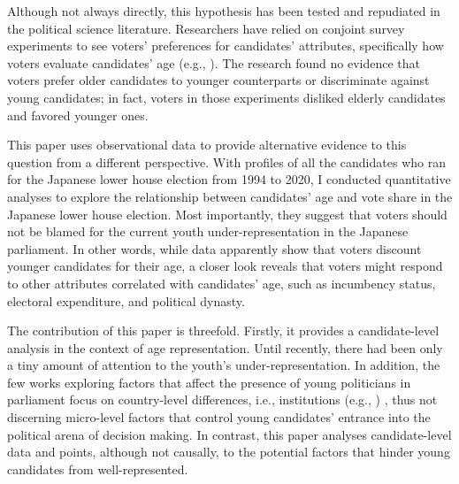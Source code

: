 \documentclass[a4paper, 12pt]{article}\usepackage[dvipdfmx]{graphicx}\usepackage[]{xcolor}
\begin{document}
Although not always directly, this hypothesis has been tested and repudiated in the political science literature. Researchers have relied on conjoint survey experiments to see voters' preferences for candidates' attributes, specifically how voters evaluate candidates' age (e.g., \citet{horiuchi2020identifying, mcclean2022too, eshima2022just}). The research found no evidence that voters prefer older candidates to younger counterparts or discriminate against young candidates; in fact, voters in those experiments disliked elderly candidates and favored younger ones. 

This paper uses observational data to provide alternative evidence to this question from a different perspective. With profiles of all the candidates who ran for the Japanese lower house election from 1994 to 2020, I conducted quantitative analyses to explore the relationship between candidates' age and vote share in the Japanese lower house election. Most importantly, they suggest that voters should not be blamed for the current youth under-representation in the Japanese parliament. In other words, while data apparently show that voters discount younger candidates for their age, a closer look reveals that voters might respond to other attributes correlated with candidates' age, such as incumbency status, electoral expenditure, and political dynasty. 

The contribution of this paper is threefold. Firstly, it provides a candidate-level analysis in the context of age representation. Until recently, there had been only a tiny amount of attention to the youth's under-representation. In addition, the few works exploring factors that affect the presence of young politicians in parliament focus on country-level differences, i.e., institutions (e.g., \citet{joshi2013representation}) \footnotemark{}, thus not discerning micro-level factors that control young candidates' entrance into the political arena of decision making. In contrast, this paper analyses candidate-level data and points, although not causally, to the potential factors that hinder young candidates from well-represented. 

\end{document}
